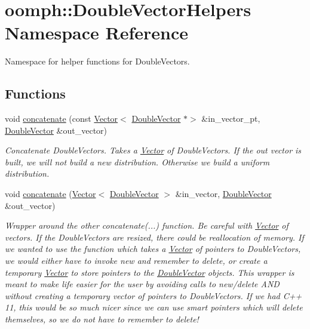\hypertarget{namespaceoomph_1_1DoubleVectorHelpers}{}\section{oomph\+:\+:Double\+Vector\+Helpers Namespace Reference}
\label{namespaceoomph_1_1DoubleVectorHelpers}


Namespace for helper functions for Double\+Vectors.  


\subsection*{Functions}
\begin{DoxyCompactItemize}
\item 
void \hyperlink{namespaceoomph_1_1DoubleVectorHelpers_ae5259ed3ae48ad417c743de0166884f8}{concatenate} (const \hyperlink{classoomph_1_1Vector}{Vector}$<$ \hyperlink{classoomph_1_1DoubleVector}{Double\+Vector} $\ast$$>$ \&in\+\_\+vector\+\_\+pt, \hyperlink{classoomph_1_1DoubleVector}{Double\+Vector} \&out\+\_\+vector)
\begin{DoxyCompactList}\small\item\em Concatenate Double\+Vectors. Takes a \hyperlink{classoomph_1_1Vector}{Vector} of Double\+Vectors. If the out vector is built, we will not build a new distribution. Otherwise we build a uniform distribution. \end{DoxyCompactList}\item 
void \hyperlink{namespaceoomph_1_1DoubleVectorHelpers_ae2e2b5728675ea85a48158f5d93f6593}{concatenate} (\hyperlink{classoomph_1_1Vector}{Vector}$<$ \hyperlink{classoomph_1_1DoubleVector}{Double\+Vector} $>$ \&in\+\_\+vector, \hyperlink{classoomph_1_1DoubleVector}{Double\+Vector} \&out\+\_\+vector)
\begin{DoxyCompactList}\small\item\em Wrapper around the other concatenate(...) function. Be careful with \hyperlink{classoomph_1_1Vector}{Vector} of vectors. If the Double\+Vectors are resized, there could be reallocation of memory. If we wanted to use the function which takes a \hyperlink{classoomph_1_1Vector}{Vector} of pointers to Double\+Vectors, we would either have to invoke new and remember to delete, or create a temporary \hyperlink{classoomph_1_1Vector}{Vector} to store pointers to the \hyperlink{classoomph_1_1DoubleVector}{Double\+Vector} objects. This wrapper is meant to make life easier for the user by avoiding calls to new/delete A\+ND without creating a temporary vector of pointers to Double\+Vectors. If we had C++ 11, this would be so much nicer since we can use smart pointers which will delete themselves, so we do not have to remember to delete! \end{DoxyCompactList}\item 
$$
\end{DoxyCompactItemize}
